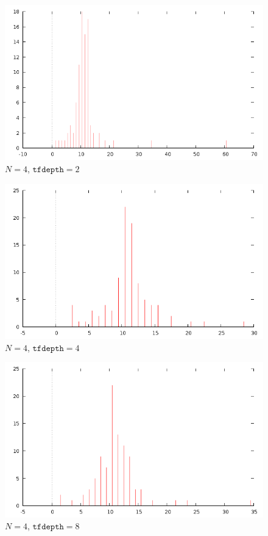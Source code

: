 \documentclass[12pt]{article}
\begin{document}
\begin{figure}[H]
\centering
\caption{$N=4$, $\texttt{tfdepth}=2$}
\includegraphics[scale=0.6]{times4-2.png}
\end{figure} 

\begin{figure}[H]
\centering
\caption{$N=4$, $\texttt{tfdepth}=4$}
\includegraphics[scale=0.6]{times4-4.png}
\end{figure} 

\begin{figure}[H]
\centering
\caption{$N=4$, $\texttt{tfdepth}=8$}
\includegraphics[scale=0.6]{times4-8.png}
\end{figure} 
\end{document}
